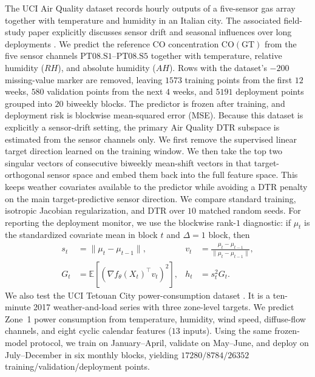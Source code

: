 \documentclass[conference]{IEEEtran}
\newcommand{\E}{\mathbb{E}}
\begin{document}
The UCI Air Quality dataset records hourly outputs of a five-sensor gas array together with temperature and humidity in an Italian city. The associated field-study paper explicitly discusses sensor drift and seasonal influences over long deployments \cite{de-vito-airquality}. We predict the reference CO concentration $\mathrm{CO(GT)}$ from the five sensor channels $\mathrm{PT08.S1}$--$\mathrm{PT08.S5}$ together with temperature, relative humidity ($RH$), and absolute humidity ($AH$). Rows with the dataset's $-200$ missing-value marker are removed, leaving $1573$ training points from the first $12$ weeks, $580$ validation points from the next $4$ weeks, and $5191$ deployment points grouped into $20$ biweekly blocks. The predictor is frozen after training, and deployment risk is blockwise mean-squared error (MSE).
Because this dataset is explicitly a sensor-drift setting, the primary Air Quality DTR subspace is estimated from the sensor channels only. We first remove the supervised linear target direction learned on the training window. We then take the top two singular vectors of consecutive biweekly mean-shift vectors in that target-orthogonal sensor space and embed them back into the full feature space. This keeps weather covariates available to the predictor while avoiding a DTR penalty on the main target-predictive sensor direction. We compare standard training, isotropic Jacobian regularization, and DTR over $10$ matched random seeds. For reporting the deployment monitor, we use the blockwise rank-$1$ diagnostic: if $\mu_t$ is the standardized covariate mean in block $t$ and $\Delta=1$ block, then
\begin{align*}
s_t &= \|\mu_t-\mu_{t-1}\|, & v_t &= \frac{\mu_t-\mu_{t-1}}{\|\mu_t-\mu_{t-1}\|}, \\
G_t &= \E[(\nabla f_\theta(X_t)^\top v_t)^2], & h_t &= s_t^2 G_t.
\end{align*}
We also test the UCI Tetouan City power-consumption dataset \cite{uci-tetouan}. It is a ten-minute 2017 weather-and-load series with three zone-level targets. We predict Zone~1 power consumption from temperature, humidity, wind speed, diffuse-flow channels, and eight cyclic calendar features ($13$ inputs). Using the same frozen-model protocol, we train on January--April, validate on May--June, and deploy on July--December in six monthly blocks, yielding $17280/8784/26352$ training/validation/deployment points.
\end{document}
